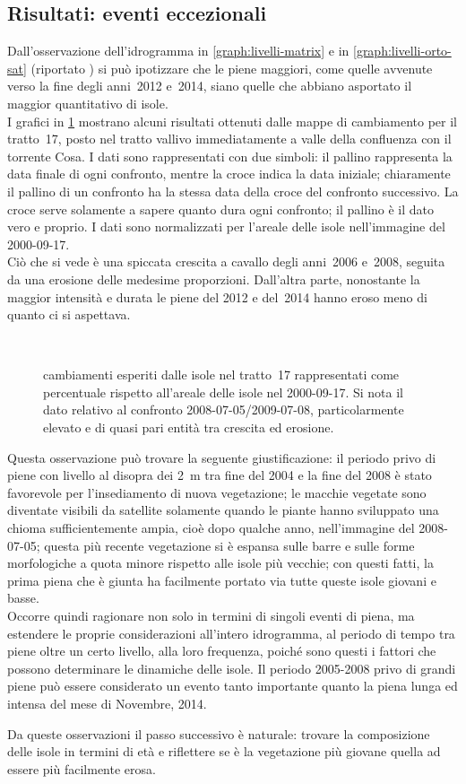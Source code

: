 \subsection{Risultati: eventi eccezionali}
\label{sec:camb-ris}
Dall'osservazione dell'idrogramma in \cref{graph:livelli-matrix} e in \cref{graph:livelli-orto-sat} (riportato ) si può ipotizzare che le piene maggiori, come quelle avvenute verso la fine degli anni~2012 e~2014, siano quelle che abbiano asportato il maggior quantitativo di isole.
\\
I grafici in \cref{graph:tr-17-camb} mostrano alcuni risultati ottenuti dalle mappe di cambiamento per il tratto~17, posto nel tratto vallivo immediatamente a valle della confluenza con il torrente Cosa.
I dati sono rappresentati con due simboli: il pallino rappresenta la data finale di ogni confronto, mentre la croce indica la data iniziale; 
chiaramente il pallino di un confronto ha la stessa data della croce del confronto successivo. 
La croce serve solamente a sapere quanto dura ogni confronto; il pallino è il dato vero e proprio.
I dati sono normalizzati per l'areale delle isole nell'immagine \AST{} del 2000-09-17.
\\
Ciò che si vede è una spiccata crescita a cavallo degli anni~2006 e~2008, seguita da una erosione delle medesime proporzioni.
Dall'altra parte, nonostante la maggior intensità e durata le piene del 2012 e del~2014 hanno eroso meno di quanto ci si aspettava.
%
\begin{figure}
	\centering
	
	\\
	
	\caption[cambiamenti esperiti dalle isole nel tratto~17]{cambiamenti esperiti dalle isole nel tratto~17 rappresentati come percentuale rispetto all'areale delle isole nel 2000-09-17. 
	Si nota il dato relativo al confronto 2008-07-05/2009-07-08, particolarmente elevato e di quasi pari entità tra crescita ed erosione.}
	\label{graph:tr-17-camb}
\end{figure}
%
Questa osservazione può trovare la seguente giustificazione: il periodo privo di piene con livello al disopra dei \SI{2}{\m} tra fine del 2004 e la fine del 2008 è stato favorevole per l'insediamento di nuova vegetazione;
le macchie vegetate sono diventate visibili da satellite solamente quando le piante hanno sviluppato una chioma sufficientemente ampia, cioè dopo qualche anno, nell'immagine del 2008-07-05;
questa più recente vegetazione si è espansa sulle barre e sulle forme morfologiche a quota minore rispetto alle isole più vecchie;
con questi fatti, la prima piena che è giunta ha facilmente portato via tutte queste isole giovani e basse.
\\
Occorre quindi ragionare non solo in termini di singoli eventi di piena, ma estendere le proprie considerazioni all'intero idrogramma, al periodo di tempo tra piene oltre un certo livello, alla loro frequenza, poiché sono questi i fattori che possono determinare le dinamiche delle isole.
Il periodo 2005-2008 privo di grandi piene può essere considerato un evento tanto importante quanto la piena lunga ed intensa del mese di Novembre, 2014.



Da queste osservazioni il passo successivo è naturale: trovare la composizione delle isole in termini di età e riflettere se è la vegetazione più giovane quella ad essere più facilmente erosa.


